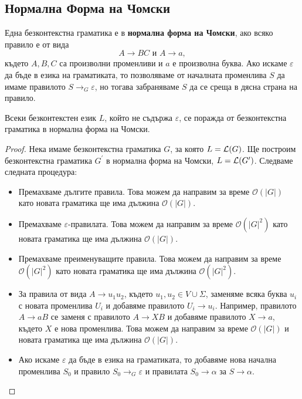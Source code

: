 \subsection{Нормална Форма на Чомски}
Една безконтекстна граматика е в {\bf нормална форма на Чомски}, ако
всяко правило е от вида
\[A \rightarrow BC\mbox{ и }A \rightarrow a,\]
където $A, B, C$ са произволни променливи и $a$ е произволна буква.
Ако искаме $\varepsilon$ да бъде в езика на граматиката, то позволяваме от началната променлива $S$ да имаме правилото $S \to_G \varepsilon$,
но тогава забраняваме $S$ да се среща в дясна страна на правило.

\begin{framed}
  \begin{theorem}
    Всеки безконтекстен език $L$, който не съдържа $\varepsilon$, се поражда от безконтекстна граматика в нормална форма на Чомски.
  \end{theorem}
\end{framed}
\begin{proof}
  Нека имаме безконтекстна граматика $G$, за която $L = \mathcal{L}(G)$.
  Ще построим безконтекстна граматика $G^\prime$ в нормална форма на Чомски, $L = \mathcal{L}(G^\prime)$.
  Следваме следната процедура:
  \begin{itemize}
  \item
    Премахваме дългите правила.
    Това можем да направим за време $\mathcal{O}(|G|)$
    като новата граматика ще има дължина $\mathcal{O}(|G|)$.
  \item
    Премахваме $\varepsilon$-правилата.
    Това можем да направим за време $\mathcal{O}(|G|^2)$
    като новата граматика ще има дължина $\mathcal{O}(|G|)$.
  \item
    Премахваме преименуващите правила.
    Това можем да направим за време $\mathcal{O}(|G|^2)$
    като новата граматика ще има дължина $\mathcal{O}(|G|^2)$.
  \item
    За правила от вида $A\to u_1 u_2$, където $u_1, u_2 \in V \cup \Sigma$, 
    заменяме всяка буква $u_i$ с новата променлива $U_i$
    и добавяме правилото $U_i\to u_i$.
    Например, правилото $A \to aB$ се заменя с правилото $A \to XB$ и добавяме правилото $X \to a$,
    където $X$ е нова променлива.
    Това можем да направим за време $\mathcal{O}(|G|)$ и новата граматика ще има дължина $\mathcal{O}(|G|)$.
  \item
    Ако искаме $\varepsilon$ да бъде в езика на граматиката, то добавяме нова начална променлива $S_0$
    и правило $S_0 \to_G \varepsilon$ и правилата $S_0 \to \alpha$ за $S \to \alpha$.
  \end{itemize}
\end{proof}

